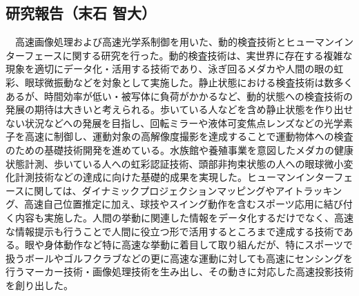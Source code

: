 \subsection{研究報告（末石 智大）}

　高速画像処理および高速光学系制御を用いた、動的検査技術とヒューマンインターフェースに関する研究を行った。動的検査技術は、実世界に存在する複雑な現象を適切にデータ化・活用する技術であり、泳ぎ回るメダカや人間の眼の虹彩、眼球微振動などを対象として実施した。静止状態における検査技術は数多くあるが、時間効率が低い・被写体に負荷がかかるなど、動的状態への検査技術の発展の期待は大きいと考えられる。歩いている人などを含め静止状態を作り出せない状況などへの発展を目指し、回転ミラーや液体可変焦点レンズなどの光学素子を高速に制御し、運動対象の高解像度撮影を達成することで運動物体への検査のための基礎技術開発を進めている。水族館や養殖事業を意図したメダカの健康状態計測、歩いている人への虹彩認証技術、頭部非拘束状態の人への眼球微小変化計測技術などの達成に向けた基礎的成果を実現した。ヒューマンインターフェースに関しては、ダイナミックプロジェクションマッピングやアイトラッキング、高速自己位置推定に加え、球技やスイング動作を含むスポーツ応用に結び付く内容も実施した。人間の挙動に関連した情報をデータ化するだけでなく、高速な情報提示も行うことで人間に役立つ形で活用するところまで達成する技術である。眼や身体動作など特に高速な挙動に着目して取り組んだが、特にスポーツで扱うボールやゴルフクラブなどの更に高速な運動に対しても高速にセンシングを行うマーカー技術・画像処理技術を生み出し、その動きに対応した高速投影技術を創り出した。